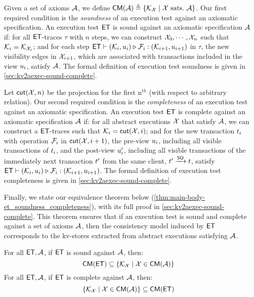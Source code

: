 \begin{theorem}[Compositionality]
Given a set of axioms $\mathcal{A}$, we define $\mathsf{CM}(\mathcal{A}) \triangleq \{\mathcal{K}_{\mathcal{X}} \mid \mathcal{X} \text{ sats.\ } \mathcal{A} \}$.
Our first required condition is the \emph{soundness} of an execution test against an axiomatic specification.
An execution test $\mathsf{ET}$ is sound against an axiomatic specification $\mathcal{A}$ if:
for all \( \mathsf{ET} \)-traces \( \tau \) with \( n \) steps, 
we can construct \( \mathcal{X}_0, \cdots, \mathcal{X}_n \) such that \( \mathcal{K}_i = \mathcal{K}_{\mathcal{X}_i} \); and
for each step \( \mathsf{ET} \vdash (\mathcal{K}_i, u_i) \triangleright_{} \mathcal{F}_i : (\mathcal{K}_{i+1}, u_{i+1}) \) in \( \tau \),
the new visibility edges in \( \mathcal{X}_{i+1} \), which are associated with transactions included in the view \( u_i \),
 satisfy \( \mathcal{A} \).
The formal definition of execution test soundness is given in \cref{sec:kv2aexec-sound-complete}.


Let \( \mathsf{cut}(\mathcal{X},n) \) be the projection for the first n\(^{th}\) (with respect to arbitrary relation).
Our second required condition is the \emph{completeness} of an execution test against an axiomatic specification.
An execution test $\mathsf{ET}$ is complete against an axiomatic specification $\mathcal{A}$ if:
for all abstract executions \( \mathcal{X} \) that satisfy \( \mathcal{A} \), 
we can construct a \( \mathsf{ET} \)-traces such that \( \mathcal{K}_i = \mathsf{cut}(\mathcal{X},i) \); and
for the new transaction \( t_i \) with operation \( \mathcal{F}_i \) in \( \mathsf{cut}(\mathcal{X},i+1) \),
the pre-view \( u_i \), including all visible transactions of \( t_i \),
and the post-view \( u'_i \), including all visible transactions of the immediately next transaction \( t' \) from the same client, \( t' \xrightarrow{\mathsf{SO}} t \),
satisfy
\( \mathsf{ET} \vdash (\mathcal{K}_i, u_i) \triangleright_{} \mathcal{F}_i : (\mathcal{K}_{i+1}, u_{i+1}) \).
The formal definition of execution test completeness is given in \cref{sec:kv2aexec-sound-complete}.
%

Finally, we state our equivalence theorem below (\cref{thm:main-body-et_soundness_completeness}), with its full proof in \cref{sec:kv2aexec-sound-complete}. 
This theorem ensures that if an execution test is sound and complete against a set of axioms $\mathcal{A}$, 
then the consistency model induced by $\mathsf{ET}$ corresponds to the kv-stores extracted from abstract executions satisfying $\mathcal{A}$.

\begin{theorem}
\label{thm:main-body-et_soundness_completeness}
For all $\mathsf{ET}, \mathcal{A}$, if $\mathsf{ET}$ is sound against $\mathcal{A}$, then:
\[
    \mathsf{CM}(\mathsf{ET}) \subseteq \{ \mathcal{K}_{\mathcal{X}} \mid \mathcal{X} \in \mathsf{CM}(\mathcal{A})\}
\]
For all $\mathsf{ET}, \mathcal{A}$, if $\mathsf{ET}$ is complete against $\mathcal{A}$, then:
\[
    \{ \mathcal{K}_{\mathcal{X}} \mid \mathcal{X} \in \mathsf{CM}(\mathcal{A})\}  \subseteq \mathsf{CM}(\mathsf{ET})
\]
\end{theorem} 


\end{theorem}
